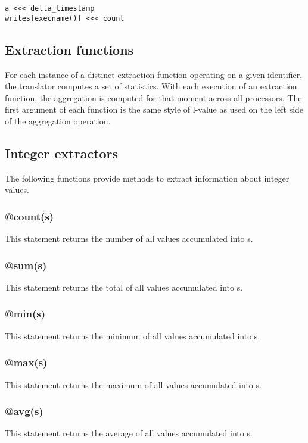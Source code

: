 \documentclass[twoside,english]{article}
\newenvironment{vindent}
{\begin{list}{}{\setlength{\listparindent}{6pt}}
\item[]}
{\end{list}}
\begin{document}
\begin{vindent}
\begin{verbatim}
a <<< delta_timestamp
writes[execname()] <<< count
\end{verbatim}
\end{vindent}

\subsection{Extraction functions}
For each instance of a distinct extraction function operating on a given
identifier, the translator computes a set of statistics. With each execution
of an extraction function, the aggregation is computed for that moment across
all processors. The first argument of each function is the same style of
l-value as used on the left side of the aggregation operation.


\subsection{Integer extractors}

The following functions provide methods to extract information about integer
values.


\subsubsection{@count(s)}
This statement returns the number of all values accumulated into s.


\subsubsection{@sum(s)}
This statement returns the total of all values accumulated into s.


\subsubsection{@min(s)}
This statement returns the minimum of all values accumulated into s.


\subsubsection{@max(s)}
This statement returns the maximum of all values accumulated into s.


\subsubsection{@avg(s)}
This statement returns the average of all values accumulated into s.
\end{document}
